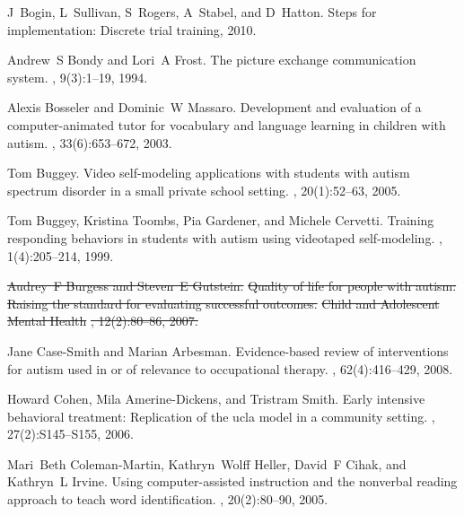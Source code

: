 \documentclass{ut-thesis}
\providecommand{\DIFdeltex}[1]{{\protect\color{red}\sout{#1}}}                      %
\providecommand{\DIFdelbegin}{} %
\providecommand{\DIFdelend}{} %
\providecommand{\DIFdel}[1]{\texorpdfstring{\DIFdeltex{#1}}{}} %
\begin{document}
\begin{thebibliography}{100}
J~Bogin, L~Sullivan, S~Rogers, A~Stabel, and D~Hatton.
\newblock Steps for implementation: Discrete trial training, 2010.

Andrew~S Bondy and Lori~A Frost.
\newblock The picture exchange communication system.
,
  9(3):1--19, 1994.

Alexis Bosseler and Dominic~W Massaro.
\newblock Development and evaluation of a computer-animated tutor for
  vocabulary and language learning in children with autism.
, 33(6):653--672,
  2003.

Tom Buggey.
\newblock Video self-modeling applications with students with autism spectrum
  disorder in a small private school setting.
,
  20(1):52--63, 2005.

Tom Buggey, Kristina Toombs, Pia Gardener, and Michele Cervetti.
\newblock Training responding behaviors in students with autism using
  videotaped self-modeling.
, 1(4):205--214,
  1999.

\DIFdelbegin %
\DIFdel{Audrey~F Burgess and Steven~E Gutstein.
}%
\DIFdel{Quality of life for people with autism: Raising the standard for
  evaluating successful outcomes.
}%
\DIFdel{Child and Adolescent Mental Health}%
\DIFdel{, 12(2):80--86, 2007.
}%

\DIFdelend {}
Jane Case-Smith and Marian Arbesman.
\newblock Evidence-based review of interventions for autism used in or of
  relevance to occupational therapy.
, 62(4):416--429, 2008.

Howard Cohen, Mila Amerine-Dickens, and Tristram Smith.
\newblock Early intensive behavioral treatment: Replication of the ucla model
  in a community setting.
,
  27(2):S145--S155, 2006.

Mari~Beth Coleman-Martin, Kathryn~Wolff Heller, David~F Cihak, and Kathryn~L
  Irvine.
\newblock Using computer-assisted instruction and the nonverbal reading
  approach to teach word identification.
,
  20(2):80--90, 2005.


\end{thebibliography}
\end{document}
